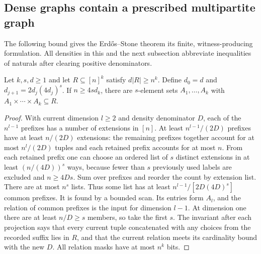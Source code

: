 \subsection{Dense graphs contain a prescribed multipartite graph}
The following bound gives the Erd\H{o}s--Stone theorem its finite,
witness-producing formulation. All densities in this and the next
subsection abbreviate inequalities of naturals after clearing positive
denominators.

\begin{lemma}\leavevmode\label{co:box}
Let $k,s,d\ge1$ and let $R\subseteq[n]^k$ satisfy $d|R|\ge n^k$.
Define $d_0=d$ and
$d_{j+1}=2d_j(4d_j)^s$. If $n\ge 4s d_k$, there are $s$-element
sets $A_1,\ldots,A_k$ with $A_1\times\cdots\times A_k\subseteq R$.
\end{lemma}
\begin{proof}
With current dimension $l\ge2$ and density denominator $D$, each of the
$n^{l-1}$ prefixes has a number of extensions in $[n]$. At least
$n^{l-1}/(2D)$ prefixes have at least $n/(2D)$ extensions: the remaining
prefixes together account for at most $n^l/(2D)$ tuples and each retained
prefix accounts for at most $n$. From each retained prefix one can choose
an ordered list of $s$ distinct extensions in at least $(n/(4D))^s$ ways,
because fewer than $s$ previously used labels are excluded and $n\ge4Ds$.
Sum over prefixes and reorder the count by extension list. There are at
most $n^s$ lists. Thus some list has at least
$n^{l-1}/[2D(4D)^s]$ common prefixes. It is found by a bounded scan.
Its entries form $A_l$, and the relation of common prefixes is the input
for dimension $l-1$. At dimension one there are at least $n/D\ge s$
members, so take the first $s$. The invariant after each projection says
that every current tuple concatenated with any choices from the recorded
suffix lies in $R$, and that the current relation meets its cardinality
bound with the new $D$. All relation masks have at most $n^k$ bits.
\end{proof}

